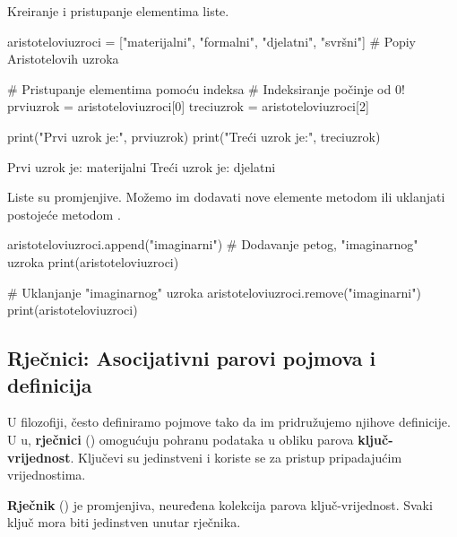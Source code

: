 \begin{primjerokvir}
    Kreiranje i pristupanje elementima liste.
    \begin{pythoncode}
aristoteloviuzroci = ["materijalni", "formalni", "djelatni", "svršni"] # Popiy Aristotelovih uzroka

# Pristupanje elementima pomoću indeksa
# Indeksiranje počinje od 0!
prviuzrok = aristoteloviuzroci[0]
treciuzrok = aristoteloviuzroci[2]

print("Prvi uzrok je:", prviuzrok)
print("Treći uzrok je:", treciuzrok)
    \end{pythoncode}

    \begin{codeoutput}
Prvi uzrok je: materijalni
Treći uzrok je: djelatni
    \end{codeoutput}

    Liste su promjenjive. Možemo im dodavati nove elemente metodom  ili uklanjati postojeće metodom .

    \begin{pythoncode}
aristoteloviuzroci.append("imaginarni") # Dodavanje petog, "imaginarnog" uzroka
print(aristoteloviuzroci)

# Uklanjanje "imaginarnog" uzroka
aristoteloviuzroci.remove("imaginarni")
print(aristoteloviuzroci)
    \end{pythoncode}
    \begin{codeoutput}
    \end{codeoutput}
\end{primjerokvir}

\subsection{Rječnici: Asocijativni parovi pojmova i definicija}

U filozofiji, često definiramo pojmove tako da im pridružujemo njihove definicije. U u, \textbf{rječnici} () omogućuju pohranu podataka u obliku parova \textbf{ključ-vrijednost}. Ključevi su jedinstveni i koriste se za pristup pripadajućim vrijednostima.

\begin{definicijaokvir}
    \textbf{Rječnik} () je promjenjiva, neuređena kolekcija parova ključ-vrijednost. Svaki ključ mora biti jedinstven unutar rječnika.
\end{definicijaokvir}

